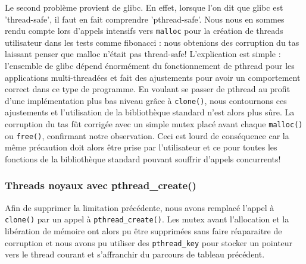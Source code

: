 Le second problème provient de glibc. En effet, lorsque l'on dit que glibc est 'thread-safe', il faut en fait comprendre 'pthread-safe'. Nous nous en sommes rendu compte lors d'appels intensifs vers \verb!malloc! pour la création de threads utilisateur dans les tests comme fibonacci : nous obtenions des corruption du tas laissant penser que malloc n'était pas thread-safe! L'explication est simple : l'ensemble de glibc dépend énormément du fonctionnement de pthread pour les applications multi-threadées et fait des ajustements pour avoir un comportement correct dans ce type de programme. En voulant se passer de pthread au profit d'une implémentation plus bas niveau grâce à \verb!clone()!, nous contournons ces ajustements et l'utilisation de la bibliothèque standard n'est alors plus sûre. La corruption du tas fût corrigée avec un simple mutex placé avant chaque \verb!malloc()! ou \verb!free()!, confirmant notre observation. Ceci est lourd de conséquence car la même précaution doit alors être prise par l'utilisateur et ce pour toutes les fonctions de la bibliothèque standard pouvant souffrir d'appels concurrents!


\subsubsection{Threads noyaux avec pthread\_create()}

Afin de supprimer la limitation précédente, nous avons remplacé l'appel à \verb!clone()! par un appel à \verb!pthread_create()!. Les mutex avant l'allocation et la libération de mémoire ont alors pu être supprimées sans faire réaparaitre de corruption et nous avons pu utiliser des \verb!pthread_key! pour stocker un pointeur vers le thread courant et s'affranchir du parcours de tableau précédent.
